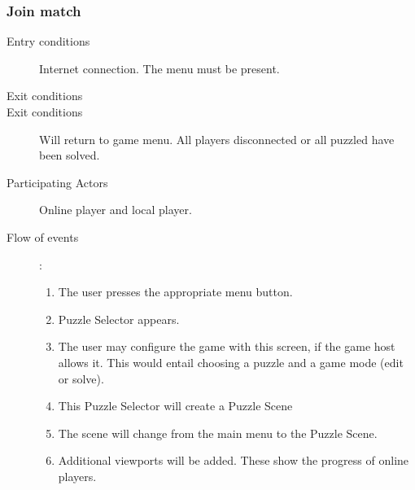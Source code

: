 \documentclass[12pt]{article}
\begin{document}
    \subsubsection{Join match}
    \begin{description}
        \item[Entry conditions] Internet connection. The menu must be present.
        \item[Exit conditions]
        \item[Exit conditions] Will return to game menu. All players
            disconnected or all puzzled have been solved.
        \item[Participating Actors] Online player and local player.
        \item[Flow of events]:
            \begin{enumerate}
                \item The user presses the appropriate menu button.
                \item Puzzle Selector appears.
                \item The user may configure the game with this screen, if
                    the game host allows it. This would
                    entail choosing a puzzle and a game mode (edit or solve).
                \item This Puzzle Selector will create a Puzzle Scene
                \item The scene will change from the main menu to the Puzzle
                    Scene.
                \item Additional viewports will be added. These show the
                    progress of online players.
            \end{enumerate}
    \end{description}


\end{document}
